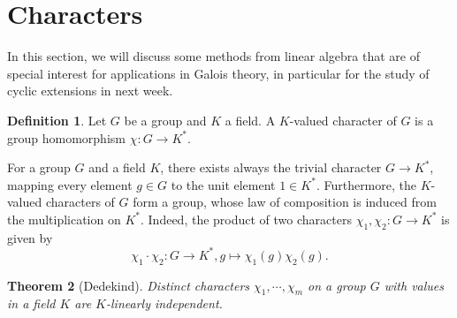 \documentclass[12pt]{report}
\newtheorem{thm}{Theorem}[section]
\theoremstyle{definition}
\newtheorem{defn}[thm]{Definition}
\def\ZZ{\mathbb{Z}}
\def\aa{\alpha}
\def\Gal{\text{Gal}}
\def\char{\text{char}}
\begin{document}


\section{Characters}

In this section, we will discuss some methods from linear algebra that are of special interest for applications in Galois theory, in particular for the  study of cyclic extensions in next week.

\begin{defn}
    Let $G$ be a group and $K$ a field. A $K$-valued character of $G$ is a group homomorphism $\chi: G \to K^*$.
\end{defn}

For a group $G$ and a field $K$, there exists always the trivial character $G \to K^*$, mapping every element $g \in G$ to the unit element $1 \in K^*$. Furthermore, the $K$-valued characters of $G$ form a group, whose law of composition is induced from the multiplication on $K^*$. Indeed, the product of two characters $\chi_1, \chi_2 : G \to K^*$ is given by $$\chi_1 \cdot \chi_2: G\to K^*, g\mapsto \chi_1(g)\chi_2(g).$$

\begin{thm}[Dedekind]
    Distinct characters $\chi_1, \cdots, \chi_m$ on a group $G$ with values in a field $K$ are $K$-linearly independent.
\end{thm}
\end{document}
